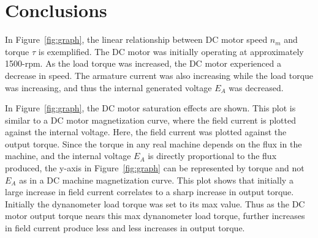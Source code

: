 \documentclass{article}
\begin{document}
\section*{Conclusions}

In Figure~\ref{fig:graph}, the linear relationship between DC motor speed $n_m$
and torque $\tau$ is exemplified.  The DC motor was initially operating at
approximately 1500-rpm.  As the load torque was increased, the DC motor
experienced a decrease in speed.  The armature current was also increasing
while the load torque was increasing, and thus the internal generated voltage
$E_A$ was decreased.

In Figure~\ref{fig:graph}, the DC motor saturation effects are shown.  This
plot is similar to a DC motor magnetization curve, where the field current is
plotted against the internal voltage.  Here, the field current was plotted
against the output torque.  Since the torque in any real machine depends on the
flux in the machine, and the internal voltage $E_A$ is directly proportional to
the flux produced, the y-axis in Figure~\ref{fig:graph} can be represented by
torque and not $E_A$ as in a DC machine magnetization curve.  This plot shows
that initially a large increase in field current correlates to a sharp increase
in output torque.  Initially the dynanometer load torque was set to its max
value.  Thus as the DC motor output torque nears this max dynanometer load
torque, further increases in field current produce less and less increases in
output torque.
\end{document}
